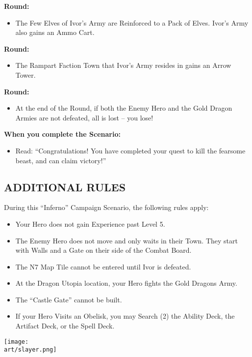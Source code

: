 \begin{multicols*}{2}
\textbf{ Round:}
\begin{itemize}
  \item The Few Elves of Ivor's Army are Reinforced to a Pack of Elves.
    Ivor's Army also gains an Ammo Cart.
\end{itemize}

\textbf{ Round:}
\begin{itemize}
  \item The Rampart Faction Town that Ivor's Army resides in gains an Arrow Tower.
\end{itemize}

\textbf{ Round:}
\begin{itemize}
  \item At the end of the Round, if both the Enemy Hero and the Gold Dragon Armies are not defeated, all is lost -- you lose!
\end{itemize}

\textbf{When you complete the Scenario:}
\begin{itemize}
  \item Read: ``Congratulations! You have completed your quest to kill the fearsome beast, and can claim victory!''
\end{itemize}


\subsection*{\MakeUppercase{Additional Rules}}

During this ``Inferno'' Campaign Scenario, the following rules apply:

\begin{itemize}
    \item Your Hero does not gain Experience past Level 5.
    \item The Enemy Hero does not move and only waits in their Town. They start with Walls and a Gate on their side of the Combat Board.
    \item The N7 Map Tile cannot be entered until Ivor is defeated.
    \item At the Dragon Utopia location, your Hero fights the Gold Dragons Army.
    \item The ``Castle Gate'' cannot be built.
    \item If your Hero Visits an Obelisk, you may Search (2) the Ability Deck, the Artifact Deck, or the Spell Deck.
\end{itemize}

\vspace*{\fill}
\texttt{[image: \\art/slayer.png]}
\vspace*{\fill}

\end{multicols*}

